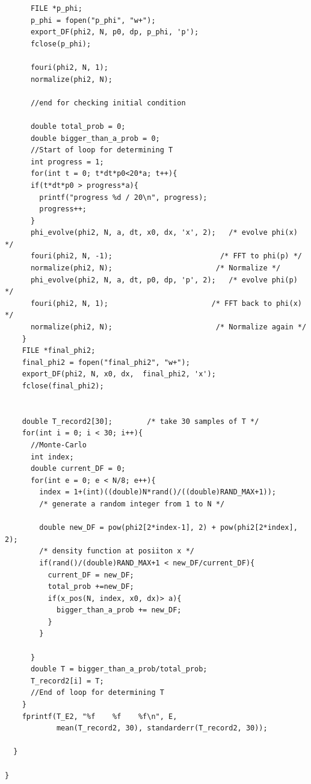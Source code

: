 \documentclass{article}
\begin{document}
\begin{verbatim}
      FILE *p_phi;
      p_phi = fopen("p_phi", "w+");
      export_DF(phi2, N, p0, dp, p_phi, 'p');
      fclose(p_phi);

      fouri(phi2, N, 1);
      normalize(phi2, N);

      //end for checking initial condition

      double total_prob = 0;
      double bigger_than_a_prob = 0;
      //Start of loop for determining T
      int progress = 1;
      for(int t = 0; t*dt*p0<20*a; t++){
      if(t*dt*p0 > progress*a){
        printf("progress %d / 20\n", progress);
        progress++;
      }
      phi_evolve(phi2, N, a, dt, x0, dx, 'x', 2);   /* evolve phi(x) */
      fouri(phi2, N, -1);                         /* FFT to phi(p) */
      normalize(phi2, N);                        /* Normalize */
      phi_evolve(phi2, N, a, dt, p0, dp, 'p', 2);   /* evolve phi(p) */
      fouri(phi2, N, 1);                        /* FFT back to phi(x) */
      normalize(phi2, N);                        /* Normalize again */
    }
    FILE *final_phi2;
    final_phi2 = fopen("final_phi2", "w+");
    export_DF(phi2, N, x0, dx,  final_phi2, 'x');
    fclose(final_phi2);


    double T_record2[30];        /* take 30 samples of T */
    for(int i = 0; i < 30; i++){
      //Monte-Carlo
      int index;
      double current_DF = 0;
      for(int e = 0; e < N/8; e++){
        index = 1+(int)((double)N*rand()/((double)RAND_MAX+1));
        /* generate a random integer from 1 to N */

        double new_DF = pow(phi2[2*index-1], 2) + pow(phi2[2*index], 2);
        /* density function at posiiton x */
        if(rand()/(double)RAND_MAX+1 < new_DF/current_DF){
          current_DF = new_DF;
          total_prob +=new_DF;
          if(x_pos(N, index, x0, dx)> a){
            bigger_than_a_prob += new_DF;
          }
        }

      }
      double T = bigger_than_a_prob/total_prob;
      T_record2[i] = T;
      //End of loop for determining T
    }
    fprintf(T_E2, "%f    %f    %f\n", E,
            mean(T_record2, 30), standarderr(T_record2, 30));

  }

}
\end{verbatim}

\hline
\end{document}
